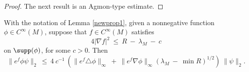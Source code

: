 \begin{proof}

The next result is an Agmon-type estimate.

\end{proof}
\begin{lemma}
  \label{lem:kl-alternative-proof-cusp-incompressibility-positivity-entropy}
 \label{newprop2}
With the notation of Lemma \ref{newprop1},
given a nonnegative function $\phi \in C^\infty(M)$,
suppose that $f \in C^\infty(M)$ satisfies
\begin{equation}
4 |\nabla f|^2 \: \le \: R \: - \: \lambda_M \: - \: c
\end{equation}
on $\supp(\phi)$, for some $c > 0$. Then
\begin{equation} \label{eig3}
\|e^f \phi \psi\|_2 \: \le \: 4 \: c^{-1} \: \left( \|e^f \triangle \phi\|_\infty
\: + \: \|e^f \nabla \phi\|_\infty (\lambda_M \: - \: \min R)^{1/2} \right)
\: \|\psi\|_2.
\end{equation}
\end{lemma}
